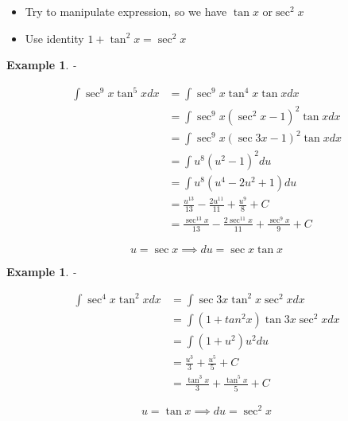 \documentclass{article}
\newtheorem{ex}[theorem]{Example}
\begin{document}
\begin{itemize}
\item Try to manipulate expression, so we have \( \tan x \text{ or} \sec ^2 x \)
\item Use identity \( 1 + \tan ^2 x = \sec ^2 x \) 
\end{itemize}

\begin{ex} - \\
\begin{minipage}{.5\textwidth} %
$$
\begin{aligned}
\int \sec ^9 x \tan ^5 x dx & = \int \sec ^9 x \tan ^4 x \tan x dx \\
& = \int \sec ^9 x (\sec ^2 x -1) ^2 \tan x dx \\
& = \int \sec ^9 x (\sec 3x - 1) ^2 \tan x dx \\
& = \int u^8 (u^2 -1 ) ^2 du \\
& = \int u^8 (u^4 - 2u^2 + 1) du \\
& = \frac{u^13}{13} - \frac{2u^11}{11} + \frac{u^9 }{8 } + C \\
& = \frac{\sec ^13 x}{13} - \frac{2\sec ^11 x}{11} + \frac{\sec ^9 x}{9} + C 
\end{aligned}
$$
\end{minipage} %
\begin{minipage}{.5\textwidth} %
$$ u = \sec x \implies du = \sec x \tan x $$
\end{minipage}
\end{ex}

\begin{ex} - \\
\begin{minipage}{.5\textwidth} %
$$
\begin{aligned}
\int \sec ^4 x \tan ^2 x dx & = \int \sec 3x \tan ^2 x \sec ^2 x dx \\ 
& = \int (1 + tan^2 x ) \tan 3x \sec ^2 x dx \\
& = \int ( 1 + u^2) u^2 du \\
& = \frac{u^3}{3} + \frac{u^5}{5} + C \\
& = \frac{\tan ^3 x}{3} + \frac{ \tan ^5 x}{5} + C 
\end{aligned}
$$
\end{minipage} %
\begin{minipage}{.5\textwidth} %
$$ u = \tan x \implies  du = \sec ^2 x$$
\end{minipage}
\end{ex}
\end{document}

